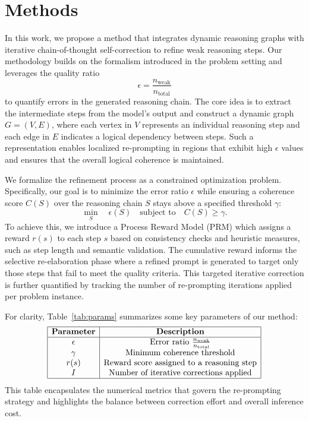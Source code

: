\documentclass[11pt]{article}
\begin{document}
\section{Methods}
In this work, we propose a method that integrates dynamic reasoning graphs with iterative chain-of-thought self-correction to refine weak reasoning steps. Our methodology builds on the formalism introduced in the problem setting and leverages the quality ratio 
\[
\epsilon = \frac{n_{\text{weak}}}{n_{\text{total}}}
\]
to quantify errors in the generated reasoning chain. The core idea is to extract the intermediate steps from the model’s output and construct a dynamic graph \(G = (V, E)\), where each vertex in \(V\) represents an individual reasoning step and each edge in \(E\) indicates a logical dependency between steps. Such a representation enables localized re-prompting in regions that exhibit high \(\epsilon\) values and ensures that the overall logical coherence is maintained.

We formalize the refinement process as a constrained optimization problem. Specifically, our goal is to minimize the error ratio \(\epsilon\) while ensuring a coherence score \(C(S)\) over the reasoning chain \(S\) stays above a specified threshold \(\gamma\):
\[
\min_{S} \quad \epsilon(S) \quad \text{subject to} \quad C(S) \geq \gamma.
\]
To achieve this, we introduce a Process Reward Model (PRM) which assigns a reward \(r(s)\) to each step \(s\) based on consistency checks and heuristic measures, such as step length and semantic validation. The cumulative reward informs the selective re-elaboration phase where a refined prompt is generated to target only those steps that fail to meet the quality criteria. This targeted iterative correction is further quantified by tracking the number of re-prompting iterations applied per problem instance.

For clarity, Table~\ref{tab:params} summarizes some key parameters of our method:
\[
\begin{array}{|c|c|}
\hline
\textbf{Parameter} & \textbf{Description} \\
\hline
\epsilon & \text{Error ratio } \frac{n_{\text{weak}}}{n_{\text{total}}} \\
\gamma & \text{Minimum coherence threshold} \\
r(s) & \text{Reward score assigned to a reasoning step} \\
I & \text{Number of iterative corrections applied} \\
\hline
\end{array}
\]
This table encapsulates the numerical metrics that govern the re-prompting strategy and highlights the balance between correction effort and overall inference cost.
\end{document}
